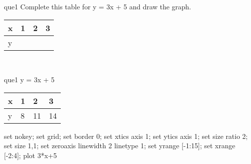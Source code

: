 \documentclass[13.5pt, varwidth=true]{beamer}
\begin{document}
\begin{frame}[shrink=19,fragile]
	\begin{beamercolorbox}[rounded=true, left, shadow=true,wd=14.8cm]{que1}
		 Complete this table for y = 3x + 5 and draw the graph. \\[0.3cm] \renewcommand{\arraystretch}{1.2}\begin{tabular}{|C|C|C|C|} \hline x & 1 & 2 & 3 \\ \hline y & & & \\ \hline \end{tabular}\\[0.3cm]
	\end{beamercolorbox}
\end{frame}
\begin{frame}[shrink=19,fragile]
	\begin{beamercolorbox}[rounded=true, left, shadow=true,wd=14.8cm]{que1}
		y = 3x + 5\renewcommand{\arraystretch}{1.2}\begin{tabular}{|C|C|C|C|} \hline x & 1 & 2 & 3 \\ \hline y & 8 & 11 & 14\\ \hline \end{tabular}\begin{gnuplot}[terminal=pdf] set nokey; set grid; set border 0; set xtics axis 1; set ytics axis 1; set size ratio 2; set size 1,1; set zeroaxis linewidth 2 linetype 1; set yrange [-1:15]; set xrange [-2:4]; plot 3*x+5 \end{gnuplot}
	\end{beamercolorbox}
\end{frame}
\end{document}
